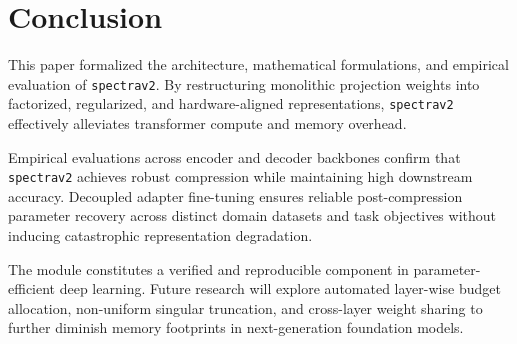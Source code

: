 \section{Conclusion}
This paper formalized the architecture, mathematical formulations, and empirical evaluation of \texttt{spectrav2}. By restructuring monolithic projection weights into factorized, regularized, and hardware-aligned representations, \texttt{spectrav2} effectively alleviates transformer compute and memory overhead.

Empirical evaluations across encoder and decoder backbones confirm that \texttt{spectrav2} achieves robust compression while maintaining high downstream accuracy. Decoupled adapter fine-tuning ensures reliable post-compression parameter recovery across distinct domain datasets and task objectives without inducing catastrophic representation degradation.

The module constitutes a verified and reproducible component in parameter-efficient deep learning. Future research will explore automated layer-wise budget allocation, non-uniform singular truncation, and cross-layer weight sharing to further diminish memory footprints in next-generation foundation models.
